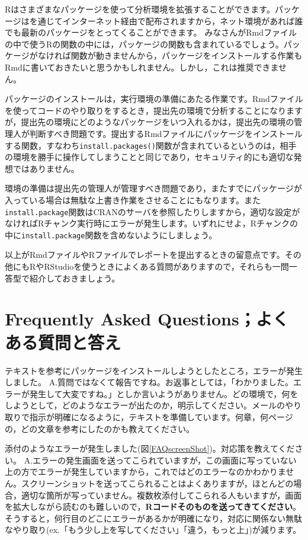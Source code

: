 \documentclass{ltjsbook}
\begin{document}
Rはさまざまなパッケージを使って分析環境を拡張することができます。パッケージはを通じてインターネット経由で配布されますから，ネット環境があれば誰でも最新のパッケージをとってくることができます。
みなさんがRmdファイルの中で使うRの関数の中には，パッケージの関数も含まれているでしょう。パッケージがなければ関数が動きませんから，パッケージをインストールする作業もRmdに書いておきたいと思うかもしれません。しかし，これは推奨できません。

パッケージのインストールは，実行環境の準備にあたる作業です。Rmdファイルを使ってコードのやり取りをするとき，提出先の環境で分析することになりますが，提出先の環境にどのようなパッケージをいつ入れるかは，提出先の環境の管理人が判断すべき問題です。提出するRmdファイルにパッケージをインストールする関数，すなわち\verb|install.packages()|関数が含まれているというのは，相手の環境を勝手に操作してしまうことと同じであり，セキュリティ的にも適切な発想ではありません。

環境の準備は提出先の管理人が管理すべき問題であり，またすでにパッケージが入っている場合は無駄な上書き作業をさせることにもなります。また\verb|install.package|関数はCRANのサーバを参照したりしますから，適切な設定がなければRチャンク実行時にエラーが発生します。いずれにせよ，Rチャンクの中に\verb|install.package|関数を含めないようにしましょう。

以上がRmdファイルやRファイルでレポートを提出するときの留意点です。その他にもRやRStudioを使うときによくある質問がありますので，それらも一問一答型で紹介しておきましょう。


\section{Frequently Asked Questions；よくある質問と答え}
\label{FreaquentlyAskedQuestions}

\begin{FAQ}{テキストを参考にパッケージをインストールしようとしたところ，エラーが発生しました。}{}
	\tcblower
	{\large A.}質問ではなくて報告ですね。お返事としては，「わかりました。エラーが発生して大変ですね。」としか言いようがありません。どの環境で，何をしようとして，どのようなエラーが出たのか，明示してください。メールのやり取りで指示が明確になるように，テキストを準備しています。何章，何ページの，どの文章を参考にしたのかも教えてください。
\end{FAQ}

\begin{FAQ}{添付のようなエラーが発生しました(図\ref{FAQscreenShot})。対応策を教えてください。}{}
	\tcblower
	{\large A.}エラーの発生画面を送ってこられていますが，この画面に写っていない上の方でエラーが発生していますから，これではどのエラーなのかわかりません。スクリーンショットを送ってこられることはよくありますが，ほとんどの場合，適切な箇所が写っていません。複数枚添付してこられる人もいますが，画面を拡大しながら読むのも難しいので，\textbf{Rコードそのものを送ってきてください}。そうすると，何行目のどこにエラーがあるかが明確になり，対応に関係ない無駄なやり取り(ex.「もう少し上を写してください」「違う，もっと上」)が減ります。
\end{FAQ}
\end{document}
